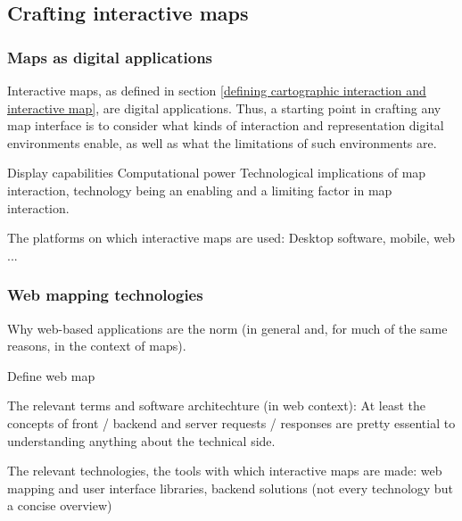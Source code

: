 \subsection{Crafting interactive maps}



\subsubsection{Maps as digital applications}

Interactive maps, as defined in
section \ref{defining cartographic interaction and interactive map},
are digital applications.
Thus, a starting point in crafting any map interface is to consider
what kinds of interaction and representation digital environments enable,
as well as what the limitations of such environments are.

Display capabilities
Computational power
Technological implications of map interaction,
technology being an enabling and a limiting factor in map interaction.


The platforms on which interactive maps are used:
Desktop software, mobile, web ...

\subsubsection{Web mapping technologies}

Why web-based applications are the norm
(in general and, for much of the same reasons, in the context of maps).

Define web map

The relevant terms and software architechture (in web context):
At least the concepts of front / backend and server requests / responses
are pretty essential to understanding anything about the technical side.

The relevant technologies, the tools with which interactive maps are made:
web mapping and user interface libraries, backend solutions
(not every technology but a concise overview)


